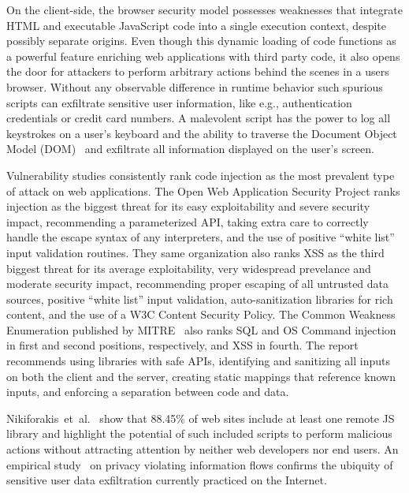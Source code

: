 On the client-side, the browser security model possesses weaknesses that integrate HTML and executable JavaScript code into a single execution context, despite possibly separate origins.
Even though this dynamic loading of code functions as a powerful feature enriching web applications with third party code, it also opens the door for attackers to perform arbitrary actions behind the scenes in a users browser.
Without any observable difference in runtime behavior such spurious scripts can exfiltrate sensitive user information, like e.g., authentication credentials or credit card numbers.
A malevolent script has the power to log all keystrokes on a user's keyboard and the ability to traverse the Document Object Model (DOM)~\cite{dom} and exfiltrate all information displayed on the user's screen.

Vulnerability studies consistently rank code injection as the most prevalent type of attack on web applications.
The Open Web Application Security Project\cite{owasp} ranks injection as the biggest threat for its easy exploitability and severe security impact, recommending a parameterized API, taking extra care to correctly handle the escape syntax of any interpreters, and the use of positive ``white list'' input validation routines.
They same organization also ranks XSS as the third biggest threat for its average exploitability, very widespread prevelance and moderate security impact, recommending proper escaping of all untrusted data sources, positive ``white list'' input validation, auto-sanitization libraries for rich content, and the use of a W3C Content Security Policy.
The Common Weakness Enumeration published by MITRE~\cite{cwe} also ranks SQL and OS Command injection in first and second positions, respectively, and XSS in fourth.
The report recommends using libraries with safe APIs, identifying and sanitizing all inputs on both the client and the server, creating static mappings that reference known inputs, and enforcing a separation between code and data.

Nikiforakis~et~al.~\cite{nikiforakis.etal+12} show that 88.45\% of web sites include at least one remote JS library and highlight the potential of such included scripts to perform malicious actions without attracting attention by neither web developers nor end users.
An empirical study~\cite{jang.etal+10} on privacy violating information flows confirms the ubiquity of sensitive user data exfiltration currently practiced on the Internet.

